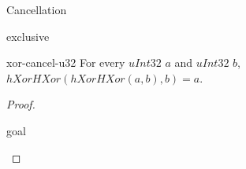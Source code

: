 \begin{lexlean}{Cancellation}
\begin{section}{exclusive}
  \begin{theorem}{xor-cancel-u32}
  For every \(uInt32\) \(a\) and \(uInt32\) \(b\), \(hXorHXor(hXorHXor(a, b), b) = a\).
  \begin{proof}
  \begin{rewrite}{goal}
  \end{rewrite}
  \end{proof}
  \end{theorem}
\end{section}
\end{lexlean}
